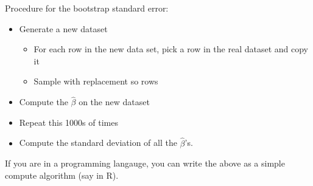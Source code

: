 \documentclass{article}
\begin{document}
Procedure for the bootstrap standard error:
\begin{itemize}
\item Generate a new dataset
\begin{itemize}
\item For each row in the new data set, pick a row in the real dataset
and copy it
\item Sample with replacement so rows 
\end{itemize}
\item Compute the $\hat\beta$ on the new dataset
\item Repeat this 1000s of times
\item Compute the standard deviation of all the $\hat\beta$'s.
\end{itemize}

If you are in a programming langauge, you can write the above as a
simple compute algorithm (say in R).
\end{document}
